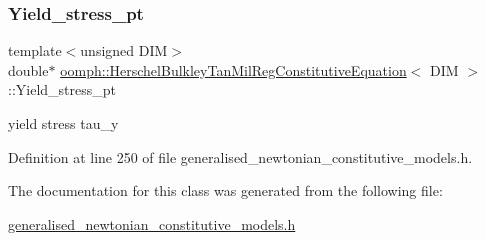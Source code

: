 \subsubsection{\texorpdfstring{Yield\+\_\+stress\+\_\+pt}{Yield\_stress\_pt}}
{\footnotesize\ttfamily template$<$unsigned D\+IM$>$ \\
double$\ast$ \hyperlink{classoomph_1_1HerschelBulkleyTanMilRegConstitutiveEquation}{oomph\+::\+Herschel\+Bulkley\+Tan\+Mil\+Reg\+Constitutive\+Equation}$<$ D\+IM $>$\+::Yield\+\_\+stress\+\_\+pt\hspace{0.3cm}{\ttfamily [private]}}



yield stress tau\+\_\+y 



Definition at line 250 of file generalised\+\_\+newtonian\+\_\+constitutive\+\_\+models.\+h.



The documentation for this class was generated from the following file\+:\begin{DoxyCompactItemize}
\item 
\hyperlink{generalised__newtonian__constitutive__models_8h}{generalised\+\_\+newtonian\+\_\+constitutive\+\_\+models.\+h}\end{DoxyCompactItemize}
